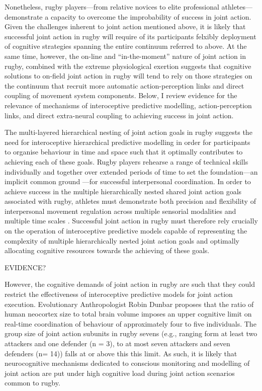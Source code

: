 \begin{CJK}{UTF8}{gbsn}
Nonetheless, rugby players---from relative novices to elite professional athletes---demonstrate a capacity to overcome the improbability of success in joint action.  Given the challenges inherent to joint action mentioned above, it is likely that successful joint action in rugby will require of its participants felxibly deployment of cognitive strategies spanning the entire continuum referred to above.  At the same time, however, the on-line and ``in-the-moment'' nature of joint action in rugby, combined with the extreme physiological exertion suggests that cognitive solutions to on-field joint action in rugby will tend to rely on those strategies on the continuum that recruit more automatic action-perception links and direct coupling of movement system components.  Below, I review evidence for the relevance of mechanisms of interoceptive predictive modelling, action-perception links, and direct extra-neural coupling to achieving success in joint action.

The multi-layered hierarchical nesting of joint action goals in rugby suggests the need for interoceptive hierarchical predictive modelling in order for participants to organise behaviour in time and space such that it optimally contributes to achieving each of these goals. Rugby players rehearse a range of technical skills individually and together over extended periods of time to set the foundation---an implicit common ground \citep[see][]{Noy2017}---for successful interpersonal coordination.  In order to achieve success in the multiple hierarchically nested shared joint action goals associated with rugby, athletes must demonstrate both precision and flexibility of interpersonal movement regulation across multiple sensorial modalities and multiple time scales \citep{Keller2014}. Successful joint action in rugby must therefore rely crucially on the operation of interoceptive predictive models capable of representing the complexity of multiple hierarchically nested joint action goals and optimally allocating cognitive resources towards the achieving of these goals.

EVIDENCE?

However, the cognitive demands of joint action in rugby are such that they could restrict the effectiveness of interoceptive predictive models for joint action execution.  Evolutionary Anthropologist Robin Dunbar \textcite{Dunbar1992} proposes that the ratio of human neocortex size to total brain volume imposes an upper cognitive limit on real-time coordination of behaviour of approximately four to five individuals.  The group size of joint action subunits in rugby sevens (e.g., ranging form at least two attackers and one defender (n = 3), to at most seven attackers and seven defenders (n= 14)) falls at or above this this limit.  As such, it is likely that neurocognitive mechanisms dedicated to conscious monitoring and modelling of joint action are put under high cognitive load during joint action scenarios common to rugby.


\end{CJK}
